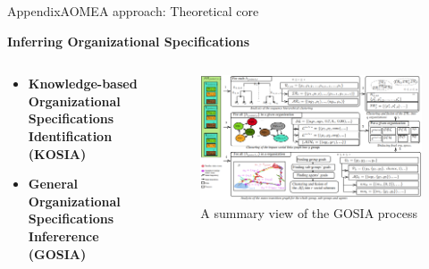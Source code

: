 \begin{frame}{Appendix}{AOMEA approach: Theoretical core}

    \textbf{Inferring Organizational Specifications}

    \begin{columns}

        \begin{column}{0.3\textwidth}

            \begin{itemize}
                \item \textbf{Knowledge-based Organizational Specifications Identification (KOSIA)}
                \item \textbf{General Organizational Specifications Infererence (GOSIA)}
            \end{itemize}

        \end{column}

        \begin{column}{0.8\textwidth}
            \begin{figure}
                \centering
                \includegraphics[width=0.95\linewidth]{figures/GOSIA_view.png}
                \caption*{A summary view of the GOSIA process}
                \label{fig:gosia_process}
            \end{figure}
        \end{column}

    \end{columns}

\end{frame}


